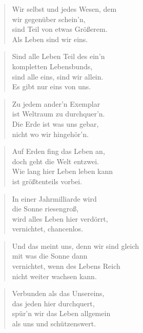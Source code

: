\documentclass[10pt,a4paper]{article}
\begin{document}
\begin{multicols}{2}
\begin{verse}
Wir selbst und jedes Wesen, dem \\
wir gegenüber schein’n, \\
sind Teil von etwas Größerem. \\
Als Leben sind wir eins. \\
\end{verse}

\begin{verse}
Sind alle Leben Teil des ein’n \\
kompletten Lebensbunds, \\
sind alle eins, sind wir allein. \\
Es gibt nur eins von uns. \\
\end{verse}

\begin{verse}
Zu jedem ander’n Exemplar \\
ist Weltraum zu durchquer’n. \\
Die Erde ist was uns gebar, \\
nicht wo wir hingehör’n. \\
\end{verse}

\begin{verse}
Auf Erden fing das Leben an, \\
doch geht die Welt entzwei. \\
Wie lang hier Leben leben kann \\
ist größtenteils vorbei. \\
\end{verse}

\begin{verse}
In einer Jahrmilliarde wird \\
die Sonne riesengroß, \\
wird alles Leben hier verdörrt, \\
vernichtet, chancenlos. \\
\end{verse}

\begin{verse}
Und das meint uns, denn wir sind gleich \\
mit was die Sonne dann \\
vernichtet, wenn des Lebens Reich \\
nicht weiter wachsen kann. \\
\end{verse}

\begin{verse}
Verbunden als das Unsereins, \\
das jeden hier durchquert, \\
spür’n wir das Leben allgemein \\
als uns und schützenswert. \\
\end{verse}


\end{multicols}
\end{document}
